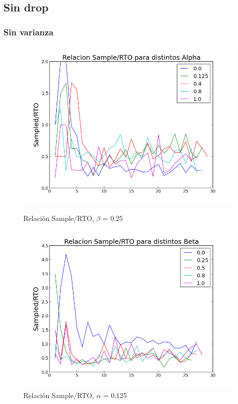 \subsection{Sin drop}

\subsubsection{Sin varianza}

\begin{figure}[H]
\begin{minipage}{0.5\linewidth}
\includegraphics[width=\linewidth]{../graficos/alphavar0drop0.png}
\caption{Relación Sample/RTO, $\beta$ = 0.25}\label{fig:alpha-var0-nodrop}
\end{minipage}
\hfill
\begin{minipage}{0.5\linewidth}
\includegraphics[width=\linewidth]{../graficos/betavar0drop0.png}
\caption{Relación Sample/RTO, $\alpha$ = 0.125}\label{fig:beta-var0-nodrop}
\end{minipage}
\end{figure}

